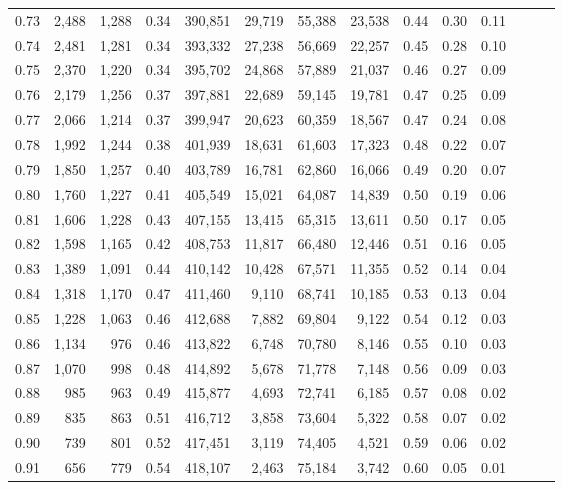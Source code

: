 \begin{tabular}{rrrrrrrrrrrrrr}
0.73 &  2,488 &  1,288 &  0.34 &  390,851 &   29,719 &  55,388 &  23,538 &  0.44 &  0.30 &      0.11 \\
0.74 &  2,481 &  1,281 &  0.34 &  393,332 &   27,238 &  56,669 &  22,257 &  0.45 &  0.28 &      0.10 \\
0.75 &  2,370 &  1,220 &  0.34 &  395,702 &   24,868 &  57,889 &  21,037 &  0.46 &  0.27 &      0.09 \\
0.76 &  2,179 &  1,256 &  0.37 &  397,881 &   22,689 &  59,145 &  19,781 &  0.47 &  0.25 &      0.09 \\
0.77 &  2,066 &  1,214 &  0.37 &  399,947 &   20,623 &  60,359 &  18,567 &  0.47 &  0.24 &      0.08 \\
0.78 &  1,992 &  1,244 &  0.38 &  401,939 &   18,631 &  61,603 &  17,323 &  0.48 &  0.22 &      0.07 \\
0.79 &  1,850 &  1,257 &  0.40 &  403,789 &   16,781 &  62,860 &  16,066 &  0.49 &  0.20 &      0.07 \\
0.80 &  1,760 &  1,227 &  0.41 &  405,549 &   15,021 &  64,087 &  14,839 &  0.50 &  0.19 &      0.06 \\
0.81 &  1,606 &  1,228 &  0.43 &  407,155 &   13,415 &  65,315 &  13,611 &  0.50 &  0.17 &      0.05 \\
0.82 &  1,598 &  1,165 &  0.42 &  408,753 &   11,817 &  66,480 &  12,446 &  0.51 &  0.16 &      0.05 \\
0.83 &  1,389 &  1,091 &  0.44 &  410,142 &   10,428 &  67,571 &  11,355 &  0.52 &  0.14 &      0.04 \\
0.84 &  1,318 &  1,170 &  0.47 &  411,460 &    9,110 &  68,741 &  10,185 &  0.53 &  0.13 &      0.04 \\
0.85 &  1,228 &  1,063 &  0.46 &  412,688 &    7,882 &  69,804 &   9,122 &  0.54 &  0.12 &      0.03 \\
0.86 &  1,134 &    976 &  0.46 &  413,822 &    6,748 &  70,780 &   8,146 &  0.55 &  0.10 &      0.03 \\
0.87 &  1,070 &    998 &  0.48 &  414,892 &    5,678 &  71,778 &   7,148 &  0.56 &  0.09 &      0.03 \\
0.88 &    985 &    963 &  0.49 &  415,877 &    4,693 &  72,741 &   6,185 &  0.57 &  0.08 &      0.02 \\
0.89 &    835 &    863 &  0.51 &  416,712 &    3,858 &  73,604 &   5,322 &  0.58 &  0.07 &      0.02 \\
0.90 &    739 &    801 &  0.52 &  417,451 &    3,119 &  74,405 &   4,521 &  0.59 &  0.06 &      0.02 \\
0.91 &    656 &    779 &  0.54 &  418,107 &    2,463 &  75,184 &   3,742 &  0.60 &  0.05 &      0.01 \\

\end{tabular}
